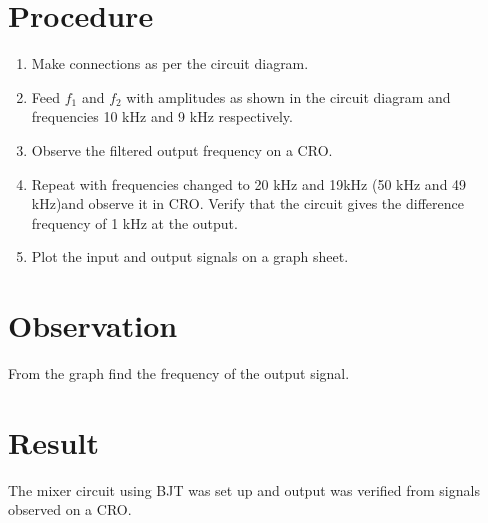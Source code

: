 \section*{Procedure}
\begin{enumerate}
\item
Make connections as per the circuit diagram.
\item
Feed $f_1$ and $f_2$ with amplitudes as shown in the circuit diagram and frequencies 10 kHz and 9 kHz respectively.
\item
Observe the filtered output frequency on a CRO.
\item
Repeat with frequencies changed to 20 kHz and 19kHz  (50 kHz and 49 kHz)and observe it in CRO. Verify that the circuit gives the difference frequency of 1 kHz at the output.
\item
Plot the input and output signals on a graph sheet. 

\end{enumerate}
\section*{Observation}
From the graph find the frequency of the output signal.\\
\section*{Result}
The mixer circuit using BJT was set up and output was verified from signals observed on a CRO.



